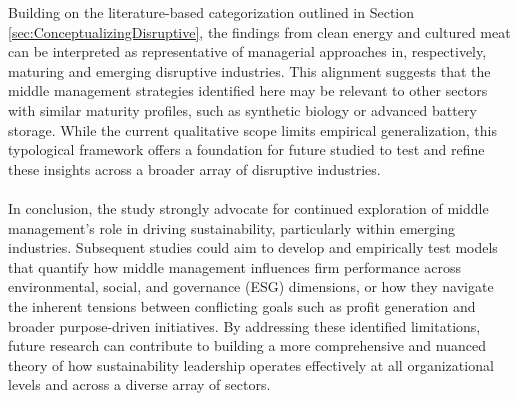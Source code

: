 	Building on the literature-based categorization outlined in Section \ref{sec:ConceptualizingDisruptive}, the findings from clean energy and cultured meat can be interpreted as representative of managerial approaches in, respectively, maturing and emerging disruptive industries. This alignment suggests that the middle management strategies identified here may be relevant to other sectors with similar maturity profiles, such as synthetic biology or advanced battery storage. While the current qualitative scope limits empirical generalization, this typological framework offers a foundation for future studied to test and refine these insights across a broader array of disruptive industries.

	\paragraph*{}In conclusion, the study strongly advocate for continued exploration of middle management's role in driving sustainability, particularly within emerging industries. Subsequent studies could aim to develop and empirically test models that quantify how middle management influences firm performance across environmental, social, and governance (ESG) dimensions, or how they navigate the inherent tensions between conflicting goals such as profit generation and broader purpose-driven initiatives. By addressing these identified limitations, future research can contribute to building a more comprehensive and nuanced theory of how sustainability leadership operates effectively at all organizational levels and across a diverse array of sectors.
